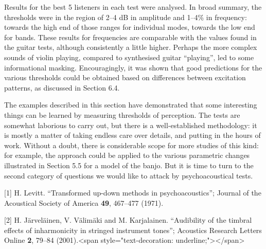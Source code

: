 



  Results for the best 5 listeners in each test were analysed. In broad 
  summary, the thresholds were in the region of 2--4 dB in amplitude and 1--4\% 
  in frequency: towards the high end of those ranges for individual modes, 
  towards the low end for bands. These results for frequencies are comparable 
  with the values found in the guitar tests, although consistently a little 
  higher. Perhaps the more complex sounds of violin playing, compared to 
  synthesised guitar ``playing'', led to some informational masking. 
  Encouragingly, it was shown that good predictions for the various thresholds 
  could be obtained based on differences between excitation patterns, as 
  discussed in Section 6.4. 

  The examples described in this section have demonstrated that some 
  interesting things can be learned by measuring thresholds of perception. The 
  tests are somewhat laborious to carry out, but there is a well-established 
  methodology: it is mostly a matter of taking endless care over details, and 
  putting in the hours of work. Without a doubt, there is considerable scope 
  for more studies of this kind: for example, the approach could be applied to 
  the various parametric changes illustrated in Section 5.5 for a model of the 
  banjo. But it is time to turn to the second category of questions we would 
  like to attack by psychoacoustical tests. 



  \sectionreferences{}[1] H. Levitt. ``Transformed up-down methods in 
  psychoacoustics''; Journal of the Acoustical Society of America \textbf{49}, 
  467--477 (1971). 

  [2] H. Järveläinen, V. Välimäki and M. Karjalainen. ``Audibility of the 
  timbral effects of inharmonicity in stringed instrument tones''; Acoustics 
  Research Letters Online \textbf{2}, 79--84 (2001).<span 
  style="text-decoration: underline;"></span> 

